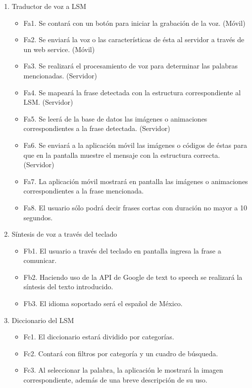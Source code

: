\begin{enumerate}[label=(\alph*)]
\item	Traductor de voz a LSM

\begin{itemize}
\item	Fa1. Se contará con un botón para iniciar la grabación de la voz. (Móvil)
\item	Fa2. Se enviará la voz o las características de ésta al servidor a través de un web service. (Móvil)
\item	Fa3. Se realizará el procesamiento de voz para determinar las palabras mencionadas. (Servidor)
\item	Fa4. Se mapeará la frase detectada con la estructura correspondiente al LSM. (Servidor)
\item	Fa5. Se leerá de la base de datos las imágenes o animaciones correspondientes a la frase detectada. (Servidor)
\item	Fa6. Se enviará a la aplicación móvil las imágenes o códigos de éstas para que en la pantalla muestre el mensaje con la estructura correcta. (Servidor)
\item	Fa7. La aplicación móvil mostrará en pantalla las imágenes o animaciones correspondientes a la frase mencionada.
\item	Fa8. El usuario sólo podrá decir frases cortas con duración no mayor a 10 segundos.
\end{itemize}

\item	Síntesis de voz a través del teclado

\begin{itemize}
\item	Fb1. El usuario a través del teclado en pantalla ingresa la frase a comunicar.
\item	Fb2. Haciendo uso de la API de Google de text to speech se realizará la síntesis del texto introducido.
\item	Fb3. El idioma soportado será el español de México.
\end{itemize}

\item	Diccionario del LSM

\begin{itemize}
\item	Fc1. El diccionario estará dividido por categorías.
\item	Fc2. Contará con filtros por categoría y un cuadro de búsqueda.
\item	Fc3. Al seleccionar la palabra, la aplicación le mostrará la imagen correspondiente, además de una breve descripción de su uso.
\end{itemize}

\end{enumerate}


